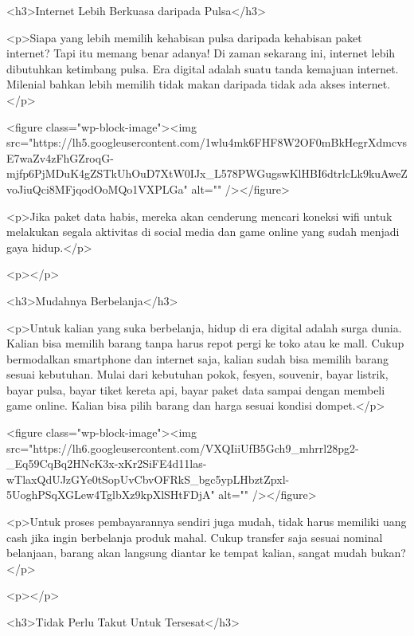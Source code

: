 <h3>Internet Lebih Berkuasa daripada Pulsa</h3>



<p>Siapa yang lebih memilih kehabisan pulsa daripada kehabisan paket internet? Tapi itu memang benar adanya! Di zaman sekarang ini, internet lebih dibutuhkan ketimbang pulsa. Era digital adalah suatu tanda kemajuan internet. Milenial bahkan lebih memilih tidak makan daripada tidak ada akses internet.</p>



<figure class="wp-block-image"><img src="https://lh5.googleusercontent.com/1wlu4mk6FHF8W2OF0mBkHegrXdmcvsE7waZv4zFhGZroqG-mjfp6PjMDuK4gZSTkUhOuD7XtW0IJx_L578PWGugswKlHBI6dtrlcLk9kuAweZvoJiuQci8MFjqodOoMQo1VXPLGa" alt="" /></figure>



<p>Jika paket data habis, mereka akan cenderung mencari koneksi wifi untuk melakukan segala aktivitas di social media dan game online yang sudah menjadi gaya hidup.</p>



<p></p>



<h3>Mudahnya Berbelanja</h3>



<p>Untuk kalian yang suka berbelanja, hidup di era digital adalah surga dunia. Kalian bisa memilih barang tanpa harus repot pergi ke toko atau ke mall. Cukup bermodalkan smartphone dan internet saja, kalian sudah bisa memilih barang sesuai kebutuhan. Mulai dari kebutuhan pokok, fesyen, souvenir, bayar listrik, bayar pulsa, bayar tiket kereta api, bayar paket data sampai dengan membeli game online. Kalian bisa pilih barang dan harga sesuai kondisi dompet.</p>



<figure class="wp-block-image"><img src="https://lh6.googleusercontent.com/VXQIiiUfB5Gch9_mhrrl28pg2-_Eq59CqBq2HNcK3x-xKr2SiFE4d11las-wTlaxQdUJzGYe0tSopUvCbvOFRkS_bgc5ypLHbztZpxl-5UoghPSqXGLew4TglbXz9kpXlSHtFDjA" alt="" /></figure>



<p>Untuk proses pembayarannya sendiri juga mudah, tidak harus memiliki uang cash jika ingin berbelanja produk mahal. Cukup transfer saja sesuai nominal belanjaan, barang akan langsung diantar ke tempat kalian, sangat mudah bukan?</p>



<p></p>



<h3>Tidak Perlu Takut Untuk Tersesat</h3>




